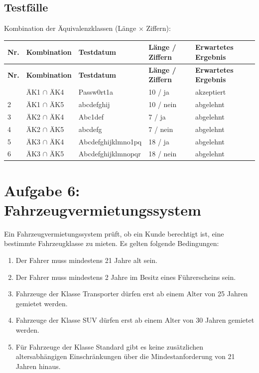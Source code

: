 \documentclass[
	fontsize=12pt,          %
	paper=a4,               %
	numbers=noenddot,       %
	listof=totoc,           %
	listof=entryprefix,     %
	listof=nochaptergap,    %
	bibliography=totoc,     %
	parskip=half,           %
	openany                 %
]{scrbook}
\begin{document}
\section*{Testfälle}

Kombination der Äquivalenzklassen (Länge $\times$ Ziffern):

\begin{longtable}{| p{0.5cm} | p{3.0cm} | p{3.8cm} | p{2.5cm} | p{3.0cm} |}
	\hline
	\textbf{Nr.} & \textbf{Kombination} & \textbf{Testdatum} & \textbf{Länge / Ziffern} & \textbf{Erwartetes Ergebnis} \\ \hline
	\endfirsthead
	\hline
	\textbf{Nr.} & \textbf{Kombination} & \textbf{Testdatum} & \textbf{Länge / Ziffern} & \textbf{Erwartetes Ergebnis} \\ \hline
	\endhead
	\hline
	\endfoot
	1 & ÄK1 $\cap$ ÄK4 & Passw0rt1a & 10 / ja & akzeptiert \\ \hline
	2 & ÄK1 $\cap$ ÄK5 & abcdefghij & 10 / nein & abgelehnt \\ \hline
	3 & ÄK2 $\cap$ ÄK4 & Abc1def & 7 / ja & abgelehnt \\ \hline
	4 & ÄK2 $\cap$ ÄK5 & abcdefg & 7 / nein & abgelehnt \\ \hline
	5 & ÄK3 $\cap$ ÄK4 & Abcdefghijklmno1pq & 18 / ja & abgelehnt \\ \hline
	6 & ÄK3 $\cap$ ÄK5 & Abcdefghijklmnopqr & 18 / nein & abgelehnt \\ \hline
\end{longtable}


\chapter*{Aufgabe 6: Fahrzeugvermietungssystem}

Ein Fahrzeugvermietungssystem prüft, ob ein Kunde berechtigt ist, eine bestimmte Fahrzeugklasse zu mieten.
Es gelten folgende Bedingungen:

\begin{enumerate}
	\item Der Fahrer muss mindestens 21 Jahre alt sein.
	\item Der Fahrer muss mindestens 2 Jahre im Besitz eines Führerscheins sein.
	\item Fahrzeuge der Klasse Transporter dürfen erst ab einem Alter von 25 Jahren gemietet werden.
	\item Fahrzeuge der Klasse SUV dürfen erst ab einem Alter von 30 Jahren gemietet werden.
	\item Für Fahrzeuge der Klasse Standard gibt es keine zusätzlichen altersabhängigen Einschränkungen über die Mindestanforderung von 21 Jahren hinaus.
\end{enumerate}
\end{document}
